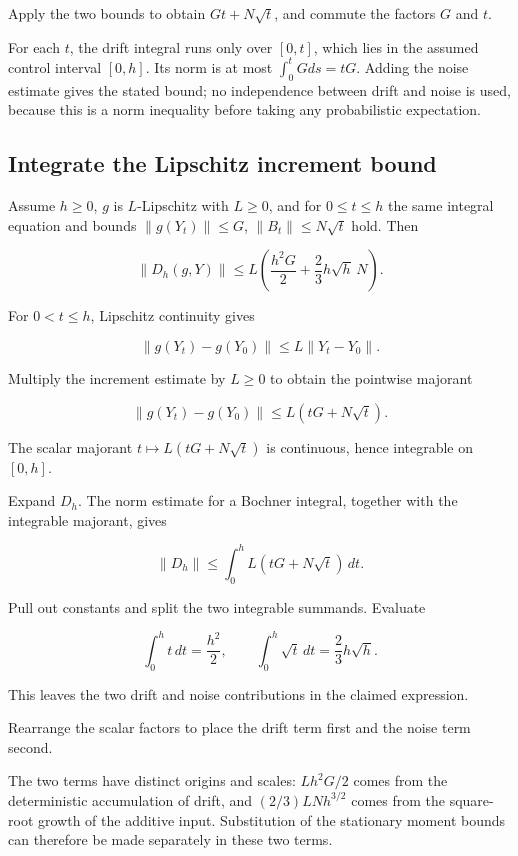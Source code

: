 \documentclass[11pt,a4paper]{article}
\begin{document}
Apply the two bounds to obtain \(Gt+N\sqrt t\), and commute the factors \(G\) and \(t\).



For each \(t\), the drift integral runs only over \([0,t]\), which lies in the assumed control interval \([0,h]\). Its norm is at most \(\int_0^tGds=tG\). Adding the noise estimate gives the stated bound; no independence between drift and noise is used, because this is a norm inequality before taking any probabilistic expectation.


\subsection{\texorpdfstring{Integrate the Lipschitz increment bound}{Integrate the Lipschitz increment bound}}


Assume \(h\ge0\), \(g\) is \(L\)-Lipschitz with \(L\ge0\), and for \(0\le t\le h\) the same integral equation and bounds \(\|g(Y_t)\|\le G\), \(\|B_t\|\le N\sqrt t\) hold. Then

\[\|D_h(g,Y)\|\le L\left(\frac{h^2G}{2}+\frac23h\sqrt h\,N\right).\]

For \(0<t\le h\), Lipschitz continuity gives

\[\|g(Y_t)-g(Y_0)\|\le L\|Y_t-Y_0\|.\]

Multiply the increment estimate by \(L\ge0\) to obtain the pointwise majorant

\[\|g(Y_t)-g(Y_0)\|\le L(tG+N\sqrt t).\]

The scalar majorant \(t\mapsto L(tG+N\sqrt t)\) is continuous, hence integrable on \([0,h]\).



Expand \(D_h\). The norm estimate for a Bochner integral, together with the integrable majorant, gives

\[\|D_h\|\le\int_0^h L(tG+N\sqrt t)\,dt.\]

Pull out constants and split the two integrable summands. Evaluate

\[\int_0^h t\,dt=\frac{h^2}{2},\qquad \int_0^h\sqrt t\,dt=\frac23h\sqrt h.\]

This leaves the two drift and noise contributions in the claimed expression.



Rearrange the scalar factors to place the drift term first and the noise term second.



The two terms have distinct origins and scales: \(Lh^2G/2\) comes from the deterministic accumulation of drift, and \((2/3)LNh^{3/2}\) comes from the square-root growth of the additive input. Substitution of the stationary moment bounds can therefore be made separately in these two terms.
\end{document}
